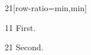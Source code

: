 \documentclass[paper=A4]{ropas-poster}
\begin{document}
\begin{postergrid}{2}{1}[row-ratio={min,min}]
\begin{posterblock}{1}{1}
First.
\end{posterblock}
\begin{posterblock}{2}{1}
Second.
\end{posterblock}
\end{postergrid}
\end{document}
